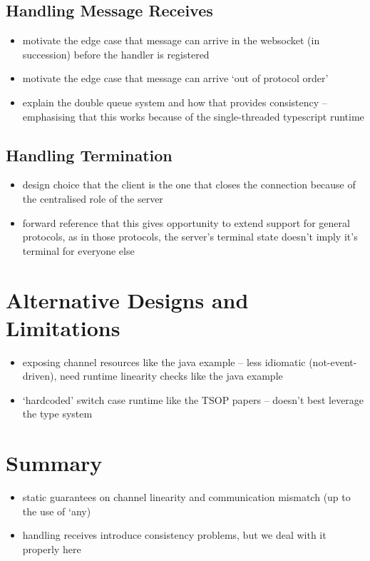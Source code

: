 \subsection{Handling Message Receives}
\begin{itemize}
\item motivate the edge case that message can arrive in the websocket (in succession) before the handler is registered
\item motivate the edge case that message can arrive `out of protocol order' 
\item explain the double queue system and how that provides consistency -- emphasising that this works because of the single-threaded typescript runtime
\end{itemize}

\subsection{Handling Termination}
\begin{itemize}
\item design choice that the client is the one that closes the connection because of the centralised role of the server
\item forward reference that this gives opportunity to extend support for general protocols, as in those protocols, the server's terminal state doesn't imply it's terminal for everyone else
\end{itemize}

\section{Alternative Designs and Limitations}

\begin{itemize}
\item exposing channel resources like the java example -- less idiomatic (not-event-driven), need runtime linearity checks like the java example
\item `hardcoded' switch case runtime like the TSOP papers -- doesn't best leverage the type system
\end{itemize}

\section{Summary}
\begin{itemize}
\item static guarantees on channel linearity and communication mismatch (up to the use of `any)
\item handling receives introduce consistency problems, but we deal with it properly here
\end{itemize}